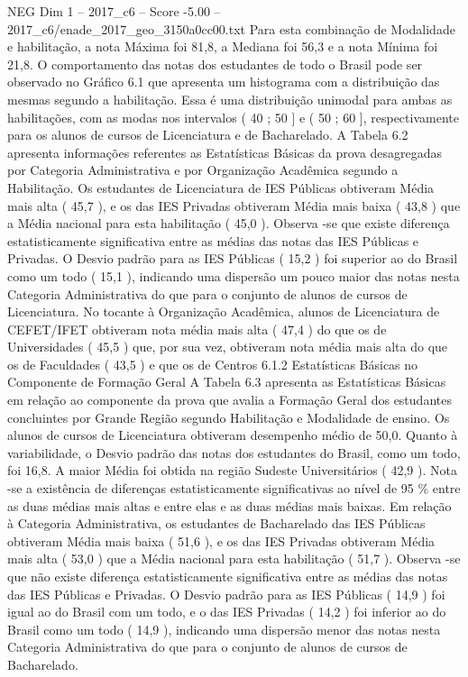 \begin{textsample}{NEG Dim 1 – 2017\_c6 – Score -5.00 – 2017\_c6/enade\_2017\_geo\_3150a0cc00.txt}
Para esta combinação de Modalidade e habilitação, a nota Máxima foi 81,8, a Mediana foi 56,3 e a nota Mínima foi 21,8.
O comportamento das notas dos estudantes de todo o Brasil pode ser observado no Gráfico 6.1 que apresenta um histograma com a distribuição das mesmas segundo a habilitação.
Essa é uma distribuição unimodal para ambas as habilitações, com as modas nos intervalos ( 40 ; 50 ] e ( 50 ; 60 ], respectivamente para os alunos de cursos de Licenciatura e de Bacharelado.
A Tabela 6.2 apresenta informações referentes as Estatísticas Básicas da prova desagregadas por Categoria Administrativa e por Organização Acadêmica segundo a Habilitação.
Os estudantes de Licenciatura de IES Públicas obtiveram Média mais alta ( 45,7 ), e os das IES Privadas obtiveram Média mais baixa ( 43,8 ) que a Média nacional para esta habilitação ( 45,0 ).
Observa -se que existe diferença estatisticamente significativa entre as médias das notas das IES Públicas e Privadas.
O Desvio padrão para as IES Públicas ( 15,2 ) foi superior ao do Brasil como um todo ( 15,1 ), indicando uma dispersão um pouco maior das notas nesta Categoria Administrativa do que para o conjunto de alunos de cursos de Licenciatura.
No tocante à Organização Acadêmica, alunos de Licenciatura de CEFET/IFET obtiveram nota média mais alta ( 47,4 ) do que os de Universidades ( 45,5 ) que, por sua vez, obtiveram nota média mais alta do que os de Faculdades ( 43,5 ) e que os de Centros 6.1.2 Estatísticas Básicas no Componente de Formação Geral A Tabela 6.3 apresenta as Estatísticas Básicas em relação ao componente da prova que avalia a Formação Geral dos estudantes concluintes por Grande Região segundo Habilitação e Modalidade de ensino.
Os alunos de cursos de Licenciatura obtiveram desempenho médio de 50,0.
Quanto à variabilidade, o Desvio padrão das notas dos estudantes do Brasil, como um todo, foi 16,8.
A maior Média foi obtida na região Sudeste Universitários ( 42,9 ).
Nota -se a existência de diferenças estatisticamente significativas ao nível de 95 \% entre as duas médias mais altas e entre elas e as duas médias mais baixas.
Em relação à Categoria Administrativa, os estudantes de Bacharelado das IES Públicas obtiveram Média mais baixa ( 51,6 ), e os das IES Privadas obtiveram Média mais alta ( 53,0 ) que a Média nacional para esta habilitação ( 51,7 ).
Observa -se que não existe diferença estatisticamente significativa entre as médias das notas das IES Públicas e Privadas.
O Desvio padrão para as IES Públicas ( 14,9 ) foi igual ao do Brasil com um todo, e o das IES Privadas ( 14,2 ) foi inferior ao do Brasil como um todo ( 14,9 ), indicando uma dispersão menor das notas nesta Categoria Administrativa do que para o conjunto de alunos de cursos de Bacharelado.

\end{textsample}
